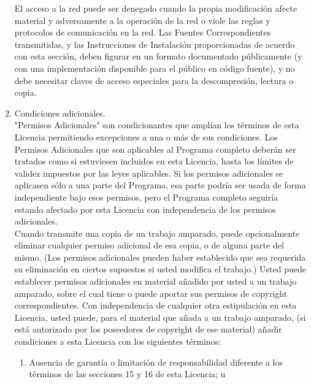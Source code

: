 \begin{enumerate}
	El acceso a la red puede ser denegado cuando la propia modificación afecte material y adversamente a la operación de la red o viole las reglas y protocolos de comunicación en la red. Las Fuentes Correspondientes transmitidas, y las Instrucciones de Instalación proporcionadas de acuerdo con esta sección, deben figurar en un formato documentado públicamente (y con una implementación disponible para el público en código fuente), y no debe necesitar claves de acceso especiales para la descompresión, lectura o copia.\\
	
	\item Condiciones adicionales.\\
	
	"Permisos Adicionales" son condicionantes que amplían los términos de esta Licencia permitiendo excepciones a una o más de sus condiciones. Los Permisos Adicionales que son aplicables al Programa completo deberán ser tratados como si estuviesen incluidos en esta Licencia, hasta los límites de validez impuestos por las leyes aplicables. Si los permisos adicionales se aplicasen sólo a una parte del Programa, esa parte podría ser usada de forma independiente bajo esos permisos, pero el Programa completo seguiría estando afectado por esta Licencia con independencia de los permisos adicionales.\\
	
	Cuando transmite una copia de un trabajo amparado, puede opcionalmente eliminar cualquier permiso adicional de esa copia, o de alguna parte del mismo. (Los permisos adicionales pueden haber establecido que sea requerida su eliminación en ciertos supuestos si usted modifica el trabajo.) Usted puede establecer permisos adicionales en material añadido por usted a un trabajo amparado, sobre el cual tiene o puede aportar sus permisos de copyright correspondientes. Con independencia de cualquier otra estipulación en esta Licencia, usted puede, para el material que añada a un trabajo amparado, (si está autorizado por los poseedores de copyright de ese material) añadir condiciones a esta Licencia con los siguientes términos:\\
	
	\begin{enumerate}
		
		\item Ausencia de garantía o limitación de responsabilidad diferente a los términos de las secciones 15 y 16 de esta Licencia; u\\
		

\end{enumerate}
\end{enumerate}
